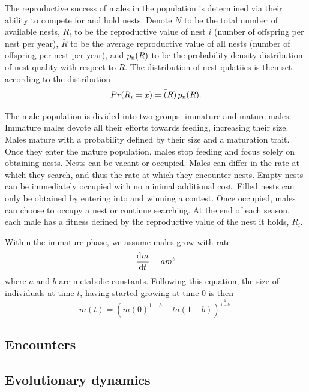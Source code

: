 \documentclass[a4paper,11pt]{article}
\begin{document}
The reproductive success of males in the population is determined via their ability to compete for and hold nests. Denote $N$ to be the total number of available nests, $R_i$ to be the reproductive value of nest $i$ (number of offspring per nest per year), $\bar{R}$ to be the average reproductive value of all nests (number of offspring per nest per year), and $p_{\rm n}(R)$ to be the probability density distribution of nest quality with respect to $R$. The distribution of nest qulatiies is then set according to the distribution
\begin{equation} \label{eq:pdf_R}
Pr(R_i = x) =\bar(R) \, p_{\rm n}(R).
\end{equation}

The male population is divided into two groups: immature and mature males. Immature males devote all their efforts towards feeding, increasing their size. Males mature with a probability defined by their size and a maturation trait. Once they enter the mature population, males stop feeding and focus solely on obtaining nests. Nests can be vacant or occupied. Males can differ in the rate at which they search, and thus the rate at which they encounter nests. Empty nests can be immediately occupied with no minimal additional cost. Filled nests can only be obtained by entering into and winning a contest. Once occupied, males can choose to occupy a nest or continue searching. At the end of each season, each male has a fitness defined by the reproductive value of the nest it holds, $R_i$.

Within the immature phase, we assume males grow with rate
\begin{equation} \label{eq:growth}
\frac{{\rm d} m}{{\rm d} t} = a m^{b}
\end{equation}
where $a$ and $b$ are metabolic constants. Following this equation, the size of individuals at time $t$, having started growing at time $0$ is then
\begin{equation} \label{eq:growth}
m(t) = \left(m(0)^{1-b} + t a(1-b)\right)^{\frac1{1-b}}.
\end{equation}

\subsection{Encounters}


\subsection{Evolutionary dynamics}
\end{document}
